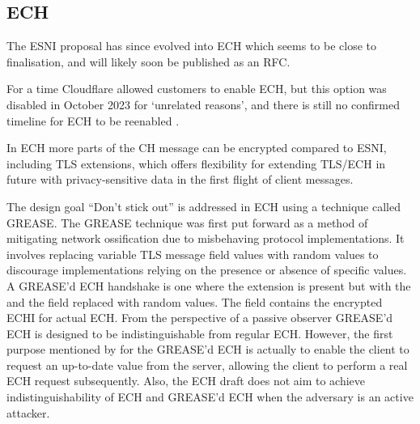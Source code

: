 

\subsection{ECH}

The \ac{ESNI} proposal has since evolved into
\ac{ECH} which seems to be close to
finalisation, and will likely soon
be published as an \ac{RFC}.


For a time Cloudflare allowed customers to enable \ac{ECH},
but this option was disabled in October 2023
for `unrelated reasons',
and there is still no confirmed timeline for
\ac{ECH} to be reenabled \citep{cloudflare-ech-disabled}.

In \ac{ECH} more parts of the \ac{CH} message
can be encrypted compared to \ac{ESNI},
including \ac{TLS} extensions,
which offers flexibility for extending
\ac{TLS}/\ac{ECH} in future with privacy-sensitive data
in the first flight of client messages.

The design goal ``Don't stick out'' is addressed
in \ac{ECH} using a technique called \ac{GREASE}.
The \ac{GREASE} technique was first put forward as
a method of mitigating network ossification due to
misbehaving protocol implementations.
It involves replacing variable \ac{TLS} message field values with random values to discourage
implementations relying on the presence or absence
of specific values.
A \ac{GREASE}'d \ac{ECH} handshake is one where the \varech{} extension is present but with the  and the  field replaced with random values.
The  field contains the encrypted \ac{ECHI} for actual \ac{ECH}.
From the perspective of a passive observer \ac{GREASE}'d \ac{ECH} is designed to be
indistinguishable from regular \ac{ECH}.
However, the first purpose mentioned by \cite{esni} for the \ac{GREASE}'d \ac{ECH} is actually
to enable the client to request an up-to-date  value
from the server,
allowing the client to perform
a real \ac{ECH} request subsequently.
Also, the \ac{ECH} draft does not aim to achieve indistinguishability of \ac{ECH} and \ac{GREASE}'d \ac{ECH} when the adversary
is an active attacker.

